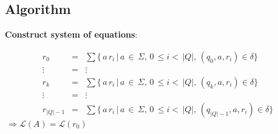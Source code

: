 \documentclass{beamer}
\begin{document}
\subsection*{Algorithm}
\begin{frame}
    \textbf{Construct system of equations}:

    \begin{equation}
        \begin{array}{lcl} 
            r_0 & = & \displaystyle\sum\limits \{ \, a \, r_i \, | \, a \, \in \, \Sigma, \, 0 \, \leq i < \, |Q|, \, (q_0, a, r_i) \in \delta \} \\ 
           \vdots &  = & \vdots \\
            r_k & = & \displaystyle\sum\limits \{ \, a \, r_i \, | \, a \, \in \, \Sigma, \, 0 \, \leq i < \, |Q|, \, (q_k, a, r_i) \in \delta \} \\ 
           \vdots &  = & \vdots \\
        r_{|Q|-1} & = & \displaystyle\sum\limits \{ \, a \, r_i \, | \, a \, \in \, \Sigma, \, 0 \, \leq i < \, |Q|, \, (q_{|Q|-1}, a, r_i) \in \delta \}

        \end{array}
    \end{equation}
    $\, \Rightarrow \mathcal{L}(A) = \mathcal{L}(r_0)$
\end{frame}

\begin{frame}
\end{frame}
\end{document}
